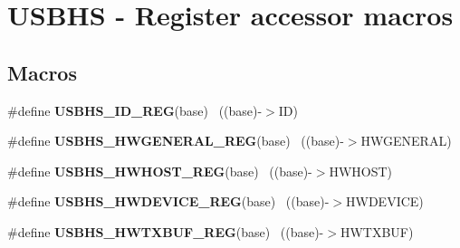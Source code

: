 \hypertarget{group___u_s_b_h_s___register___accessor___macros}{}\section{U\+S\+B\+H\+S -\/ Register accessor macros}
\label{group___u_s_b_h_s___register___accessor___macros}
\subsection*{Macros}
\begin{DoxyCompactItemize}
\item 
\hypertarget{group___u_s_b_h_s___register___accessor___macros_ga91e392ac4986bc5cbb1bb11a463d9922}{}\#define {\bfseries U\+S\+B\+H\+S\+\_\+\+I\+D\+\_\+\+R\+E\+G}(base)                                          ~((base)-\/$>$I\+D)\label{group___u_s_b_h_s___register___accessor___macros_ga91e392ac4986bc5cbb1bb11a463d9922}

\item 
\hypertarget{group___u_s_b_h_s___register___accessor___macros_ga66fca577b05c8277b2c9ab096f983db1}{}\#define {\bfseries U\+S\+B\+H\+S\+\_\+\+H\+W\+G\+E\+N\+E\+R\+A\+L\+\_\+\+R\+E\+G}(base)                            ~((base)-\/$>$H\+W\+G\+E\+N\+E\+R\+A\+L)\label{group___u_s_b_h_s___register___accessor___macros_ga66fca577b05c8277b2c9ab096f983db1}

\item 
\hypertarget{group___u_s_b_h_s___register___accessor___macros_ga27099aebe24013140a75a71859763667}{}\#define {\bfseries U\+S\+B\+H\+S\+\_\+\+H\+W\+H\+O\+S\+T\+\_\+\+R\+E\+G}(base)                                  ~((base)-\/$>$H\+W\+H\+O\+S\+T)\label{group___u_s_b_h_s___register___accessor___macros_ga27099aebe24013140a75a71859763667}

\item 
\hypertarget{group___u_s_b_h_s___register___accessor___macros_ga9acbaf7a2d41c11445ca835edf8ffab8}{}\#define {\bfseries U\+S\+B\+H\+S\+\_\+\+H\+W\+D\+E\+V\+I\+C\+E\+\_\+\+R\+E\+G}(base)                              ~((base)-\/$>$H\+W\+D\+E\+V\+I\+C\+E)\label{group___u_s_b_h_s___register___accessor___macros_ga9acbaf7a2d41c11445ca835edf8ffab8}

\item 
\hypertarget{group___u_s_b_h_s___register___accessor___macros_gaf4e25fd44fa0da1883b121847a17a09f}{}\#define {\bfseries U\+S\+B\+H\+S\+\_\+\+H\+W\+T\+X\+B\+U\+F\+\_\+\+R\+E\+G}(base)                                ~((base)-\/$>$H\+W\+T\+X\+B\+U\+F)\label{group___u_s_b_h_s___register___accessor___macros_gaf4e25fd44fa0da1883b121847a17a09f}


\end{DoxyCompactItemize}

